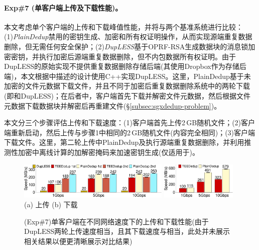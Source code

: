 \paragraph*{Exp\#7 (单客户端上传及下载性能)。}本文考虑单个客户端的上传和下载峰值性能，并将\sysnameS 与两个基准系统进行比较：(1)\textit{PlainDedup}禁用\sysnameS 的密钥生成、加密和所有权证明操作，从而实现源端重复数据删除，但无需任何安全保护；(2)\textit{DupLESS}\cite{bellare2013DupLESS}基于OPRF-RSA生成数据块的消息锁加密密钥，并执行加密后源端重复数据删除，但不内包数据所有权证明。由于DupLESS的原始实现不提供重复数据删除存储后端(其使用Dropbox作为存储后端)，本文根据\cite{bellare2013DupLESS}中描述的设计使用C++实现DupLESS。这里，PlainDedup基于未加密的文件元数据下载文件，并且不同于加密后重复数据删除系统中的两轮下载(即\sysnameS 和DupLESS)；在后者中，客户端首先下载并解密文件元数据，然后根据文件元数据下载数据块并解密后再重建文件(\S\ref{subsec:sgxdedup-problem})。

本文分三个步骤评估上传和下载速度：(1)客户端首先上传2\,GB随机文件；(2)客户端重新启动，然后上传与步骤1中相同的2\,GB随机文件(内容完全相同)；(3)客户端下载文件。这里，第二轮上传中PlainDedup及\sysnameS 执行源端重复数据删除，并利用推测性加密中离线计算的加解密掩码来加速密钥生成(仅适用于\sysnameS)。

\begin{figure}[!htb]
    \centering
    \includegraphics[width=0.646\textwidth]{pic/sgxdedup/upload_network_speed_bar.pdf} 
    \includegraphics[width=0.324\textwidth]{pic/sgxdedup/download_network_speed_bar.pdf}
    \\
      \hspace{1.1in} {\small (a) 上传} \hspace{1.9in}
    {\small (b) 下载}\\
    \caption{(Exp\#7)单客户端在不同网络速度下的上传和下载性能(由于DupLESS两轮上传速度相当，且其下载速度与\sysnameS 相当，此处并未展示相关结果以便更清晰展示对比结果)}
    \label{fig:sgxdedup-singleClientThroughput}
\end{figure}

